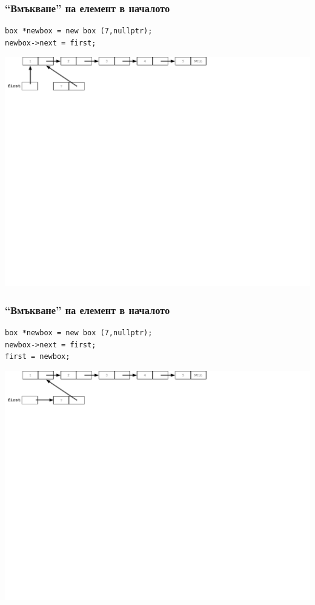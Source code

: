 \documentclass{beamer}
\begin{document}
\begin{frame}[fragile]
\frametitle{``Вмъкване'' на елемент в началото}

\begin{flushleft}
\begin{lstlisting}
box *newbox = new box (7,nullptr);
newbox->next = first;
\end{lstlisting}  
\end{flushleft}


\includegraphics[width=14.0cm]{images/03_ll_push_firstlink.pdf}

\end{frame}



\begin{frame}[fragile]
\frametitle{``Вмъкване'' на елемент в началото}

\begin{flushleft}
\begin{lstlisting}
box *newbox = new box (7,nullptr);
newbox->next = first;
first = newbox;
\end{lstlisting}  
\end{flushleft}


\includegraphics[width=14.0cm]{images/03_ll_push_secondtlink.pdf}

\end{frame}
\end{document}
